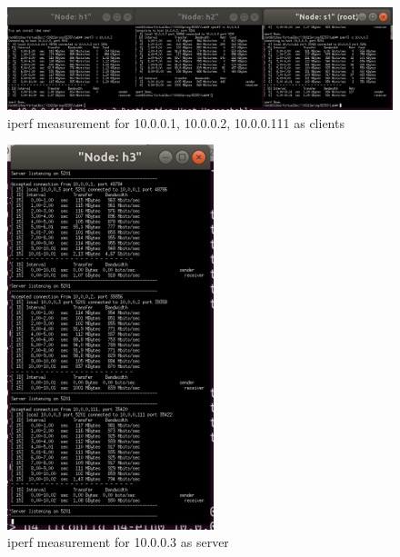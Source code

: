 \begin{exercise}[]
\begin{solution}
  \begin{figure}[ht]
    \begin{center}
    \includegraphics[width=16cm]{img/lab4/ex2-2-4.png}
    \caption{iperf measurement for 10.0.0.1, 10.0.0.2, 10.0.0.111 as clients}
    \label{fig:ex2-2-4}
    \end{center}
  \end{figure}

  \begin{figure}[ht]
    \begin{center}
    \includegraphics[width=6cm]{img/lab4/ex2-2-5.png}
    \caption{iperf measurement for 10.0.0.3 as server}
    \label{fig:ex2-2-5}
    \end{center}
  \end{figure}

  \end{solution}
  \label{ex2}
\end{exercise}

\newpage

